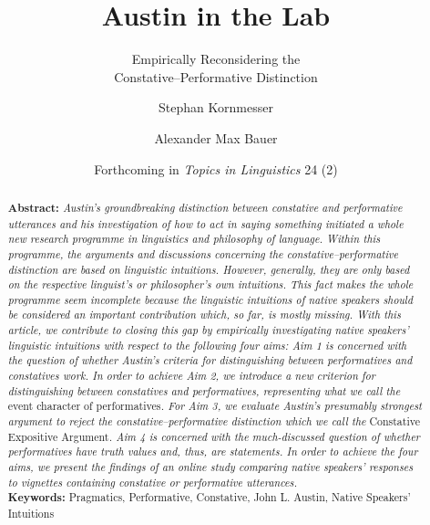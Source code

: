 \documentclass[egregdoesnotlikesansseriftitles,12pt]{scrartcl}
\title{Austin in the Lab}
\subtitle{Empirically Reconsidering the\\Constative--Performative Distinction}
\author[1*]{Stephan Kornmesser}
\author[1]{Alexander Max Bauer}
\affil[1]{ Department of Philosophy, University of Oldenburg, Germany}
\affil[*]{ Corresponding Author, E-Mail: \href{mailto:stephan.kornmesser@uni-oldenburg.de}{stephan.kornmesser@uni-oldenburg.de}}
\date{\small Forthcoming in \textit{Topics in Linguistics} 24 (2)}
\begin{document}
\maketitle

\vspace{\fill}
\begin{abstract}
   \noindent\textbf{Abstract:} \textit{Austin's groundbreaking distinction between constative and performative utterances and his investigation of how to act in saying something initiated a whole new research programme in linguistics and philosophy of language. Within this programme, the arguments and discussions concerning the constative--performative distinction are based on linguistic intuitions. However, generally, they are only based on the respective linguist's or philosopher's own intuitions. This fact makes the whole programme seem incomplete because the linguistic intuitions of native speakers should be considered an important contribution which, so far, is mostly missing. With this article, we contribute to closing this gap by empirically investigating native speakers' linguistic intuitions with respect to the following four aims: Aim 1 is concerned with the question of whether Austin's criteria for distinguishing between performatives and constatives work. In order to achieve Aim 2, we introduce a new criterion for distinguishing between constatives and performatives, representing what we call the }event character of performatives\textit{. For Aim 3, we evaluate Austin's presumably strongest argument to reject the constative--performative distinction which we call the }Constative Expositive Argument\textit{. Aim 4 is concerned with the much-discussed question of whether performatives have truth values and, thus, are statements. In order to achieve the four aims, we present the findings of an online study comparing native speakers' responses to vignettes containing constative or performative utterances.}\\[2ex]
   \textbf{Keywords:} Pragmatics, Performative, Constative, John L. Austin, Native Speakers' Intuitions
\end{abstract}


\clearpage
\end{document}
